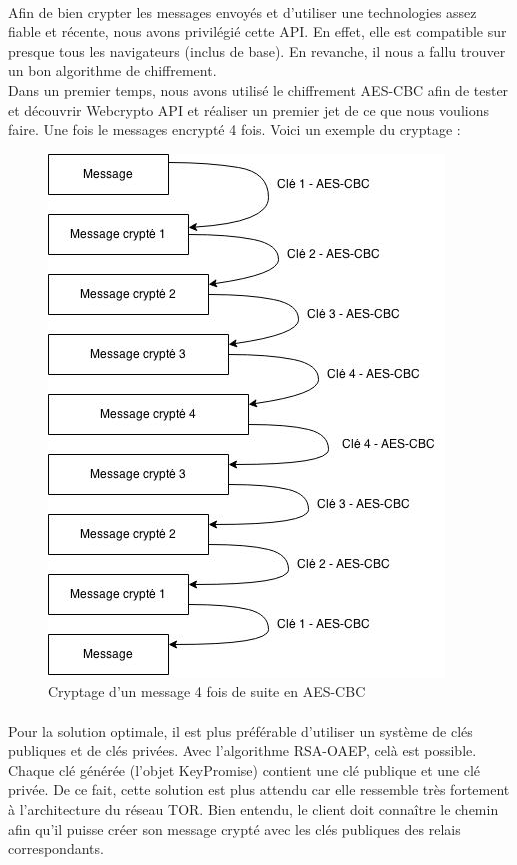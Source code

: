 \documentclass[a4paper,12pt]{report}
\begin{document}
	\paragraph*{}
	Afin de bien crypter les messages envoyés et d'utiliser une technologies assez fiable et récente, nous avons privilégié cette API. En effet, elle est compatible sur presque tous les navigateurs (inclus de base). En revanche, il nous a fallu trouver un bon algorithme de chiffrement.\\
	Dans un premier temps, nous avons utilisé le chiffrement AES-CBC afin de tester et découvrir Webcrypto API et réaliser un premier jet de ce que nous voulions faire. Une fois le messages encrypté 4 fois. Voici un exemple du cryptage :
	\newpage	
	\begin{figure}[h] %
		\includegraphics[scale=0.70]{AES.jpg}
		\caption{Cryptage d'un message 4 fois de suite en AES-CBC}
		\label{AES}
	\end{figure}
	\paragraph*{}
	Pour la solution optimale, il est plus préférable d'utiliser un système de clés publiques et de clés privées. Avec l'algorithme RSA-OAEP, celà est possible. Chaque clé générée (l'objet KeyPromise) contient une clé publique et une clé privée. De ce fait, cette solution est plus attendu car elle ressemble très fortement à l'architecture du réseau TOR. Bien entendu, le client doit connaître le chemin afin qu'il puisse créer son message crypté avec les clés publiques des relais correspondants.
	
\end{document}
